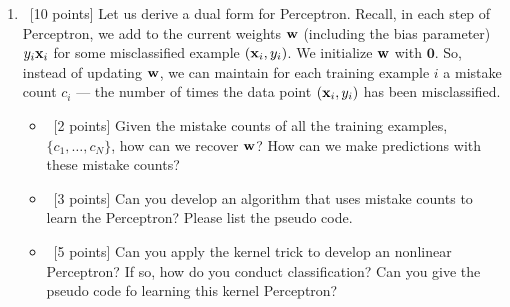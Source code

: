 \documentclass[12pt, fullpage,letterpaper]{article}
\begin{document}
\begin{enumerate}
	\item~[10 points] Let us derive a dual form for Perceptron. Recall, in each step of Perceptron, we add to the current weights ${\bf w}$ (including the bias parameter) $y_i{\bf x}_i$ for some misclassified example $({\bf x}_i, y_i)$. We initialize ${\bf w}$ with $\mathbf{0}$. So, instead of updating ${\bf w}$, we can maintain for each training example $i$ a mistake count $c_i$ --- the number of times the data point $({\bf x}_i, y_i)$ has been misclassified. 
	
	\begin{itemize}
		\item~[2 points] Given the mistake counts of all the training examples, $\{c_1, \ldots, c_N\}$, how can we recover ${\bf w}$? How can we make predictions with these mistake counts? 
		\item~[3 points] Can you develop an algorithm that uses mistake counts to learn the Perceptron? Please list the pseudo code. 
		\item~[5 points] Can you apply the kernel trick to develop an nonlinear Perceptron? If so, how do you conduct classification? Can you give the pseudo code fo learning this kernel Perceptron? 
	\end{itemize}   
	
\end{enumerate}
\end{document}
